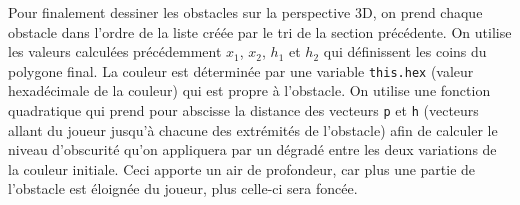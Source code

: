 \documentclass[11pt,french,a4paper,]{article}
\begin{document}
Pour finalement dessiner les obstacles sur la perspective 3D, on prend
chaque obstacle dans l'ordre de la liste créée par le tri de la section
précédente. On utilise les valeurs calculées précédemment \(x_1\),
\(x_2\), \(h_1\) et \(h_2\) qui définissent les coins du polygone final.
La couleur est déterminée par une variable \texttt{this.hex} (valeur
hexadécimale de la couleur) qui est propre à l'obstacle. On utilise une
fonction quadratique qui prend pour abscisse la distance des vecteurs
\texttt{p} et \texttt{h} (vecteurs allant du joueur jusqu'à chacune des
extrémités de l'obstacle) afin de calculer le niveau d'obscurité qu'on
appliquera par un dégradé entre les deux variations de la couleur
initiale. Ceci apporte un air de profondeur, car plus une partie de
l'obstacle est éloignée du joueur, plus celle-ci sera foncée.
\end{document}
